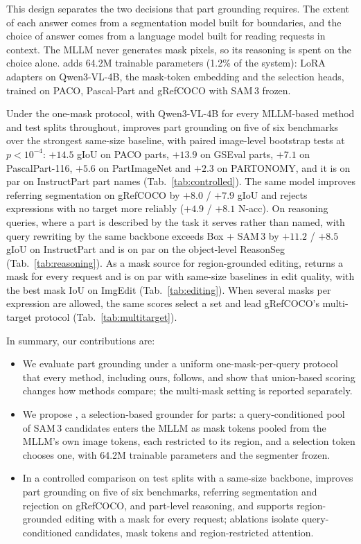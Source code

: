 This design separates the two decisions that part grounding requires. The extent of each answer comes from a
segmentation model built for boundaries, and the choice of answer comes from a language model built for reading
requests in context. The MLLM never generates mask pixels, so its reasoning is spent on the choice alone. \ours{}
adds 64.2M trainable parameters (1.2\% of the system): LoRA adapters on Qwen3-VL-4B, the mask-token embedding and
the selection heads, trained on PACO, Pascal-Part and gRefCOCO with SAM\,3 frozen.

Under the one-mask protocol, with Qwen3-VL-4B for every MLLM-based method and test splits throughout, \ours{}
improves part grounding on five of six benchmarks over the strongest same-size baseline, with paired image-level
bootstrap tests at $p<10^{-4}$: $+14.5$ gIoU on PACO parts, $+13.9$ on GSEval parts, $+7.1$ on PascalPart-116,
$+5.6$ on PartImageNet and $+2.3$ on PARTONOMY, and it is on par on InstructPart part names
(Tab.~\ref{tab:controlled}). The same model improves referring segmentation on gRefCOCO by $+8.0$ / $+7.9$ gIoU and
rejects expressions with no target more reliably ($+4.9$ / $+8.1$ N-acc). On reasoning queries, where a part is
described by the task it serves rather than named, \ours{} with query rewriting by the same backbone exceeds
Box + SAM\,3 by $+11.2$ / $+8.5$ gIoU on InstructPart and is on par on the object-level ReasonSeg
(Tab.~\ref{tab:reasoning}). As a mask source for region-grounded editing, \ours{} returns a mask for every request
and is on par with same-size baselines in edit quality, with the best mask IoU on ImgEdit (Tab.~\ref{tab:editing}).
When several masks per expression are allowed, the same scores select a set and lead gRefCOCO's multi-target protocol
(Tab.~\ref{tab:multitarget}).

In summary, our contributions are:
\begin{itemize}
\item We evaluate part grounding under a uniform one-mask-per-query protocol that every method, including ours,
  follows, and show that union-based scoring changes how methods compare; the multi-mask setting is reported
  separately.
\item We propose \ours{}, a selection-based grounder for parts: a query-conditioned pool of SAM\,3 candidates enters
  the MLLM as mask tokens pooled from the MLLM's own image tokens, each restricted to its region, and a selection
  token chooses one, with 64.2M trainable parameters and the segmenter frozen.
\item In a controlled comparison on test splits with a same-size backbone, \ours{} improves part grounding on five of
  six benchmarks, referring segmentation and rejection on gRefCOCO, and part-level reasoning, and supports
  region-grounded editing with a mask for every request; ablations isolate query-conditioned candidates, mask
  tokens and region-restricted attention.
\end{itemize}
